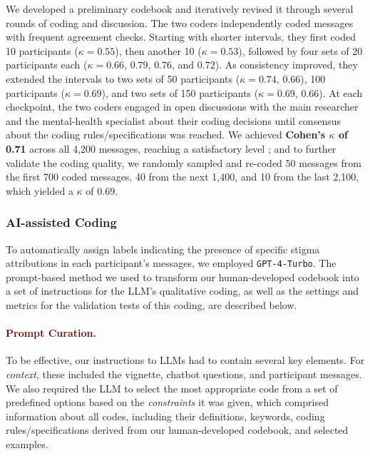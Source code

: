 We developed a preliminary codebook and iteratively revised it through several rounds of coding and discussion.
The two coders independently coded messages with frequent agreement checks. 
Starting with shorter intervals, they first coded 10 participants ($\kappa=0.55$), then another 10 ($\kappa=0.53$), followed by four sets of 20 participants each ($\kappa=0.66$, $0.79$, $0.76$, and $0.72$). 
As consistency improved, they extended the intervals to two sets of 50 participants ($\kappa=0.74$, $0.66$), 100 participants ($\kappa=0.69$), and two sets of 150 participants ($\kappa=0.69$, $0.66$). 
At each checkpoint, the two coders engaged in open discussions with the main researcher and the mental-health specialist about their coding decisions until consensus about the coding rules/specifications was reached.
We achieved \textbf{Cohen's $\kappa$ of 0.71} across all 4,200 messages, reaching a satisfactory level \cite{cohens_kappa_mchugh_2012}; and to further validate the coding quality, we randomly sampled and re-coded 50 messages from the first 700 coded messages, 40 from the next 1,400, and 10 from the last 2,100, which yielded a $\kappa$ of 0.69.


\subsubsection{AI-assisted Coding}
\label{method:auto}

To automatically assign labels indicating the presence of specific stigma attributions in each participant's messages, we employed \texttt{GPT-4-Turbo}. 
The prompt-based method we used to transform our human-developed codebook into a set of instructions for the LLM's qualitative coding, as well as the settings and metrics for the validation tests of this coding, are described below.

\paragraph{\textcolor{darkred}{\textbf{Prompt Curation.}}}
To be effective, our instructions to LLMs had to contain several key elements. 
For \textit{context}, these included the vignette, chatbot questions, and participant messages. 
We also required the LLM to select the most appropriate code from a set of predefined options based on the \textit{constraints} it was given, which comprised information about all codes, including their definitions, keywords, coding rules/specifications derived from our human-developed codebook, and selected examples.


